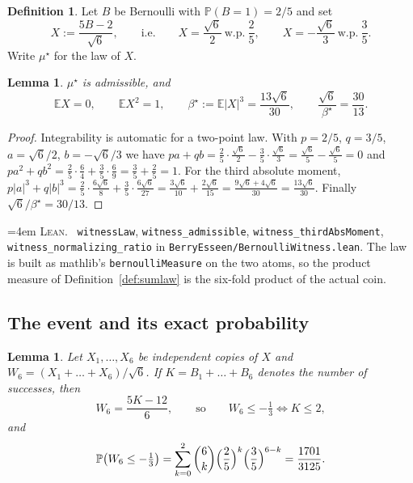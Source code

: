 \documentclass[10pt,a4paper]{article}
\theoremstyle{plain}
\newtheorem{lemma}[theorem]{Lemma}
\theoremstyle{definition}
\newtheorem{definition}[theorem]{Definition}
\newcommand{\E}{\mathbb{E}}
\newcommand{\PR}{\mathbb{P}}
\newcommand{\lean}[1]{\texttt{#1}}
\newcommand{\file}[1]{\texttt{#1}}
\newenvironment{leanref}%
  {\par\addvspace{3pt}\begingroup\sloppy\emergencystretch=4em
   \noindent\footnotesize\textsc{Lean.}\ \ignorespaces}%
  {\par\endgroup\addvspace{3pt}}
\begin{document}
\begin{definition}\label{def:witness}
Let $B$ be Bernoulli with $\PR(B=1)=2/5$ and set
\[
  X := \frac{5B-2}{\sqrt6},
  \qquad\text{i.e.}\qquad
  X = \frac{\sqrt6}{2} \ \text{w.p.}\ \frac25,
  \qquad
  X = -\frac{\sqrt6}{3} \ \text{w.p.}\ \frac35 .
\]
Write $\mu^\star$ for the law of $X$.
\end{definition}

\begin{lemma}\label{lem:witness-moments}
$\mu^\star$ is admissible, and
\[
  \E X = 0,\qquad \E X^2 = 1,\qquad
  \beta^\star := \E|X|^3 = \frac{13\sqrt6}{30},
  \qquad \frac{\sqrt6}{\beta^\star} = \frac{30}{13}.
\]
\end{lemma}

\begin{proof}
Integrability is automatic for a two-point law. With $p=2/5$, $q=3/5$,
$a=\sqrt6/2$, $b=-\sqrt6/3$ we have $pa+qb=\frac25\cdot\frac{\sqrt6}{2}
-\frac35\cdot\frac{\sqrt6}{3}=\frac{\sqrt6}{5}-\frac{\sqrt6}{5}=0$ and
$pa^2+qb^2=\frac25\cdot\frac64+\frac35\cdot\frac69=\frac35+\frac25=1$.
For the third absolute moment,
$p|a|^3+q|b|^3=\frac25\cdot\frac{6\sqrt6}{8}+\frac35\cdot\frac{6\sqrt6}{27}
=\frac{3\sqrt6}{10}+\frac{2\sqrt6}{15}=\frac{9\sqrt6+4\sqrt6}{30}
=\frac{13\sqrt6}{30}$. Finally
$\sqrt6/\beta^\star=30/13$.
\end{proof}

\begin{leanref}
\lean{witnessLaw}, \lean{witness\_admissible}, \lean{witness\_thirdAbsMoment},
\lean{witness\_normalizing\_ratio} in \file{BerryEsseen/BernoulliWitness.lean}.
The law is built as mathlib's \lean{bernoulliMeasure} on the two atoms, so the
product measure of Definition~\ref{def:sumlaw} is the six-fold product of the
actual coin.
\end{leanref}

\subsection{The event and its exact probability}

\begin{lemma}\label{lem:witness-event}
Let $X_1,\dots,X_6$ be independent copies of $X$ and
$W_6=(X_1+\dots+X_6)/\sqrt6$. If $K=B_1+\dots+B_6$ denotes the number of
successes, then
\[
  W_6 = \frac{5K-12}{6},
  \qquad\text{so}\qquad
  W_6\le-\tfrac13 \iff K\le2,
\]
and
\[
  \PR\bigl(W_6\le-\tfrac13\bigr) = \sum_{k=0}^{2}\binom6k
  \Bigl(\frac25\Bigr)^{k}\Bigl(\frac35\Bigr)^{6-k}
  = \frac{1701}{3125}.
\]
\end{lemma}
\end{document}
